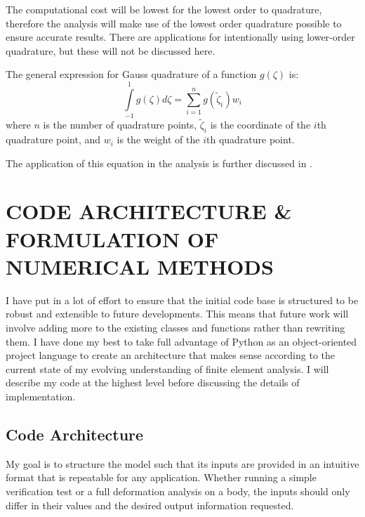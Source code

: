 \documentclass[]{spie}  %
\begin{document}
The computational cost will be lowest for the lowest order to quadrature, therefore the analysis will make use of the lowest order quadrature possible to ensure accurate results. There are applications for intentionally using lower-order quadrature, but these will not be discussed here.

The general expression for Gauss quadrature of a function $g(\zeta)$ is:
\begin{equation}
\label{eq: Gauss quadrature general}
\int\limits_{-1}^{1} g(\zeta)d\zeta = \sum\limits_{i=1}^{n} g(\tilde{\zeta}_i) w_i
\end{equation}
where $n$ is the number of quadrature points, $\tilde{\zeta}_i$ is the coordinate of the $i$th quadrature point, and $w_i$ is the weight of the $i$th quadrature point. 

The application of this equation in the analysis is further discussed in \textit{}.


\section{CODE ARCHITECTURE \& FORMULATION OF NUMERICAL METHODS} 

I have put in a lot of effort to ensure that the initial code base is structured to be robust and extensible to future developments. This means that future work will involve adding more to the existing classes and functions rather than rewriting them. I have done my best to take full advantage of Python as an object-oriented project language to create an architecture that makes sense according to the current state of my evolving understanding of finite element analysis. I will describe my code at the highest level before discussing the details of implementation.

\subsection{Code Architecture}
My goal is to structure the model such that its inputs are provided in an intuitive format that is repeatable for any application. Whether running a simple verification test or a full deformation analysis on a body, the inputs should only differ in their values and the desired output information requested.
\end{document}
